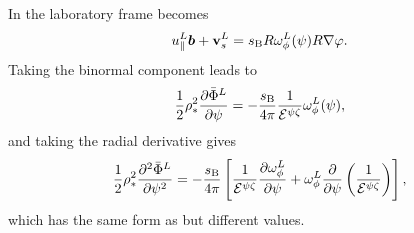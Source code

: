 In the laboratory frame  becomes 
\begin{equation}
u_\parallel^L \vec{b} + {\bf v}_s^L  = s_{\rm B} R \omega_\phi^L(\psi) R \nabla \varphi.
\label{eq:toroidal2}
\end{equation}
Taking the binormal component leads to
\begin{equation}
 {1 \over 2} \rho_*^2 {\partial \bar{\Phi}^L \over \partial \psi} = - {s_{\rm B} \over 4 \pi}{1 \over
\mathcal{E}^{\psi \zeta}}\omega^L_{\phi}(\psi),
\end{equation}
and taking the radial derivative gives
\begin{equation}
 {1 \over 2} \rho_*^2 {\partial^2 \bar{\Phi}^L \over \partial \psi^2} = - {s_{\rm B} \over 4 \pi}\left[{1 \over
\mathcal{E}^{\psi \zeta}}{\partial \omega^L_{\phi} \over \partial \psi} + \omega^L_{\phi}{\partial \over \partial
\psi} \left({1 \over \mathcal{E}^{\psi \zeta}}\right)\right],
\end{equation}
which has the same form as  but different values.

